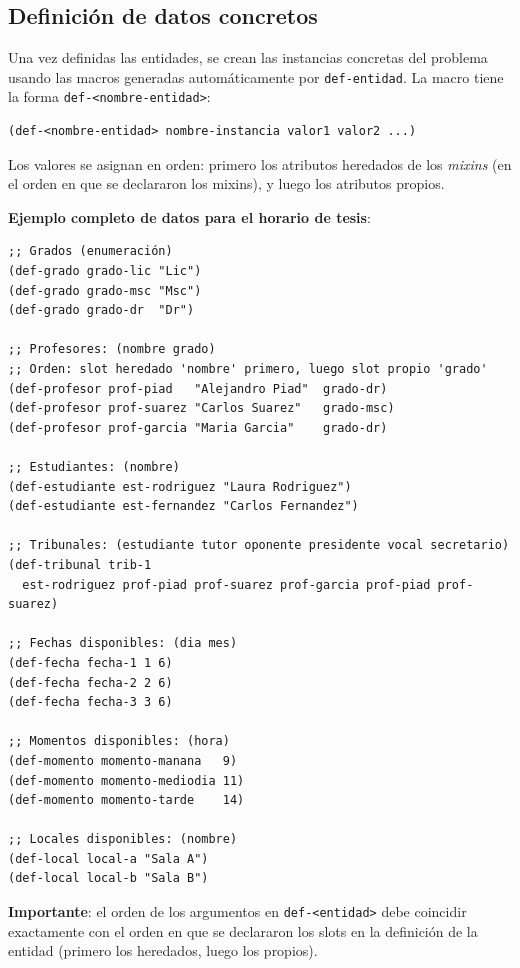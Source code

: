 \documentclass[12pt,a4paper]{article}
\newcommand{\code}[1]{\texttt{#1}}
\begin{document}
\subsection{Definición de datos concretos}
\label{sec:datos}

Una vez definidas las entidades, se crean las instancias concretas del
problema usando las macros generadas automáticamente por \code{def-entidad}.
La macro tiene la forma \code{def-<nombre-entidad>}:

\begin{lstlisting}[style=lisp, caption={Sintaxis general para instanciar entidades}]
(def-<nombre-entidad> nombre-instancia valor1 valor2 ...)
\end{lstlisting}

Los valores se asignan en orden: primero los atributos heredados de los
\textit{mixins} (en el orden en que se declararon los mixins), y luego
los atributos propios.

\textbf{Ejemplo completo de datos para el horario de tesis}:

\begin{lstlisting}[style=lisp, caption={Datos concretos del dominio de tesis}]
;; Grados (enumeración)
(def-grado grado-lic "Lic")
(def-grado grado-msc "Msc")
(def-grado grado-dr  "Dr")

;; Profesores: (nombre grado)
;; Orden: slot heredado 'nombre' primero, luego slot propio 'grado'
(def-profesor prof-piad   "Alejandro Piad"  grado-dr)
(def-profesor prof-suarez "Carlos Suarez"   grado-msc)
(def-profesor prof-garcia "Maria Garcia"    grado-dr)

;; Estudiantes: (nombre)
(def-estudiante est-rodriguez "Laura Rodriguez")
(def-estudiante est-fernandez "Carlos Fernandez")

;; Tribunales: (estudiante tutor oponente presidente vocal secretario)
(def-tribunal trib-1
  est-rodriguez prof-piad prof-suarez prof-garcia prof-piad prof-suarez)

;; Fechas disponibles: (dia mes)
(def-fecha fecha-1 1 6)
(def-fecha fecha-2 2 6)
(def-fecha fecha-3 3 6)

;; Momentos disponibles: (hora)
(def-momento momento-manana   9)
(def-momento momento-mediodia 11)
(def-momento momento-tarde    14)

;; Locales disponibles: (nombre)
(def-local local-a "Sala A")
(def-local local-b "Sala B")
\end{lstlisting}

\textbf{Importante}: el orden de los argumentos en \code{def-<entidad>}
debe coincidir exactamente con el orden en que se declararon los slots
en la definición de la entidad (primero los heredados, luego los propios).
\end{document}

